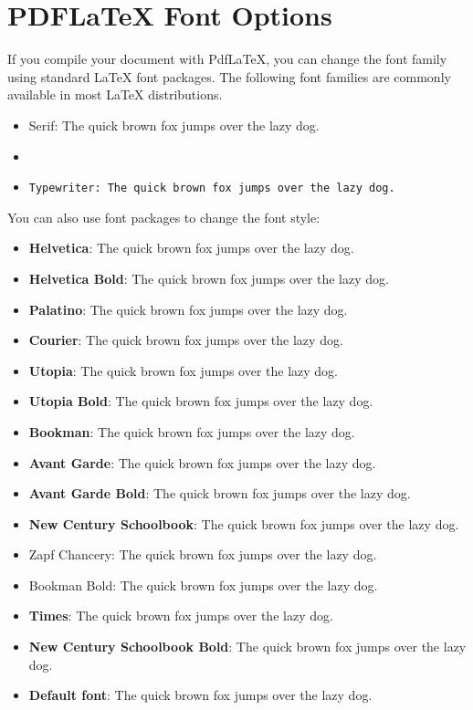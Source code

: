 
\section*{PDFLaTeX Font Options}

If you compile your document with PdfLaTeX, you can change the font family using standard LaTeX font packages.
The following font families are commonly available in most LaTeX distributions.\\

\begin{itemize}[noitemsep]
    \item \rm{Serif: The quick brown fox jumps over the lazy dog.}
    \item {}
    \item \tt{Typewriter: The quick brown fox jumps over the lazy dog.}
\end{itemize}
You can also use font packages to change the font style:
\begin{itemize}[noitemsep]
    \item { \textbf{Helvetica}: The quick brown fox jumps over the lazy dog.}
    \item { \textbf{Helvetica Bold}: The quick brown fox jumps over the lazy dog.}
    \item { \textbf{Palatino}: The quick brown fox jumps over the lazy dog.}
    \item { \textbf{Courier}: The quick brown fox jumps over the lazy dog.}
    \item { \textbf{Utopia}: The quick brown fox jumps over the lazy dog.}
    \item { \textbf{Utopia Bold}: The quick brown fox jumps over the lazy dog.}
    \item { \textbf{Bookman}: The quick brown fox jumps over the lazy dog.}
    \item { \textbf{Avant Garde}: The quick brown fox jumps over the lazy dog.}
    \item { \textbf{Avant Garde Bold}: The quick brown fox jumps over the lazy dog.}
    \item { \textbf{New Century Schoolbook}: The quick brown fox jumps over the lazy dog.}
    \item { Zapf Chancery: The quick brown fox jumps over the lazy dog.}
    \item { Bookman Bold: The quick brown fox jumps over the lazy dog.}
    \item { \textbf{Times}: The quick brown fox jumps over the lazy dog.}
    \item { \textbf{New Century Schoolbook Bold}: The quick brown fox jumps over the lazy dog.}
    \item \textbf{Default font}: The quick brown fox jumps over the lazy dog.
\end{itemize}


